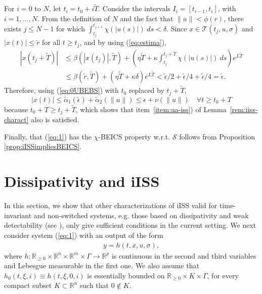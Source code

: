 \documentclass[9pt,final,journal]{IEEEtran}
\def\R{\mathbb{R}}
\def\S{\mathcal{S}}
\def\T{\mathcal{T}}
\begin{document}
\begin{IEEEproof}
For $i=0$ to $N$, let $t_i=t_0+i\tilde T$. Consider the intervals $I_i=[t_{i-1}, t_{i}]$, with $i=1,\ldots, N$. From the definition of $N$ and the fact that $\|u\|<\phi(r)$, there exists $j\le N-1$ for which $\int_{t_{j}}^{t_{j+1}} \chi(|u(s)|)\;ds<\delta$. Since $x\in \T(t_{j},u,\sigma)$ and $|x(t)|\le \tilde r$ for all $t\ge t_j$, and by using (\ref{eq:estima}),
  \begin{align*}
    |x(t_j+\tilde T)| &\le \beta(|x(t_j)|,\tilde T)+\left (\eta \tilde T+\kappa \int_{t_j}^{t_j+\tilde T} \chi(|u(s)|)\:ds\right ) e^{L\tilde T}\\
    &\le \beta(\tilde r,\tilde T)+(\eta \tilde T+\kappa \delta) e^{L\tilde T} <\tilde
\epsilon/2 + \tilde\epsilon/4 + \tilde\epsilon/4 = \tilde\epsilon.
  \end{align*}
Therefore, using (\ref{eq:0UBEBS}) with $t_0$ replaced by $t_j+\tilde{T}$, 
$$|x(t)|\le \tilde \alpha_1(\tilde \epsilon)+\tilde \alpha_2(\|u\|) \le \epsilon + \nu(\|u\|)\quad \forall t\ge t_0 + T$$ %
because $t_0+T\ge t_j+\tilde T$, which shows that item~\ref{item:ua-iss}) of Lemma~\ref{rem:iiss-charact} also is satisfied.

Finally, that (\ref{eq:1}) has the $\chi$-BEICS property w.r.t. $\S$ follows from Proposition \ref{prop:iISSimpliesBEICS}. 
\end{IEEEproof}

\section{Dissipativity and iISS}
\label{sec:dissipativity-iiss}

In this section, we show that other characterizations of iISS valid for time-invariant and non-switched systems, e.g. those based on dissipativity and weak detectability (see \cite{angson_tac00,jayrya_tac10}), only give sufficient conditions in the current setting. 
We next consider system (\ref{eq:1}) with an output of the form
\begin{align}\label{eq:2}
 y=h(t,x,u,\sigma),
\end{align}
where $h:\R_{\ge 0}\times
\R^n\times \R^m \times \Gamma\to \R^p$ is continuous in the second and third variables and Lebesgue measurable in the first one. We also assume that $h_0(t,\xi,i)\equiv h(t,\xi,0,i)$ is essentially bounded on $\R_{\ge 0} \times K \times \Gamma$, for every compact subset $K \subset \R^n$ such that $0\notin K$.
\end{document}

